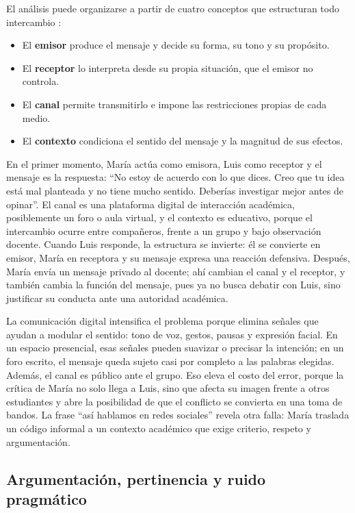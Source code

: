 \documentclass[
	spanish, %
	letterpaper, oneside
]{article}
\begin{document}
El análisis puede organizarse a partir de cuatro conceptos que estructuran todo intercambio \citep{romero2022taller}:

\begin{itemize}
  \item El \textbf{emisor} produce el mensaje y decide su forma, su tono y su propósito.
  \item El \textbf{receptor} lo interpreta desde su propia situación, que el emisor no controla.
  \item El \textbf{canal} permite transmitirlo e impone las restricciones propias de cada medio.
  \item El \textbf{contexto} condiciona el sentido del mensaje y la magnitud de sus efectos.
\end{itemize}

En el primer momento, María actúa como emisora, Luis como receptor y el mensaje es la respuesta: ``No estoy de acuerdo con lo que dices. Creo que tu idea está mal planteada y no tiene mucho sentido. Deberías investigar mejor antes de opinar''. El canal es una plataforma digital de interacción académica, posiblemente un foro o aula virtual, y el contexto es educativo, porque el intercambio ocurre entre compañeros, frente a un grupo y bajo observación docente. Cuando Luis responde, la estructura se invierte: él se convierte en emisor, María en receptora y su mensaje expresa una reacción defensiva. Después, María envía un mensaje privado al docente; ahí cambian el canal y el receptor, y también cambia la función del mensaje, pues ya no busca debatir con Luis, sino justificar su conducta ante una autoridad académica.

La comunicación digital intensifica el problema porque elimina señales que ayudan a modular el sentido: tono de voz, gestos, pausas y expresión facial. En un espacio presencial, esas señales pueden suavizar o precisar la intención; en un foro escrito, el mensaje queda sujeto casi por completo a las palabras elegidas. Además, el canal es público ante el grupo. Eso eleva el costo del error, porque la crítica de María no solo llega a Luis, sino que afecta su imagen frente a otros estudiantes y abre la posibilidad de que el conflicto se convierta en una toma de bandos. La frase ``así hablamos en redes sociales'' revela otra falla: María traslada un código informal a un contexto académico que exige criterio, respeto y argumentación.

\subsection{Argumentación, pertinencia y ruido pragmático}
\end{document}
